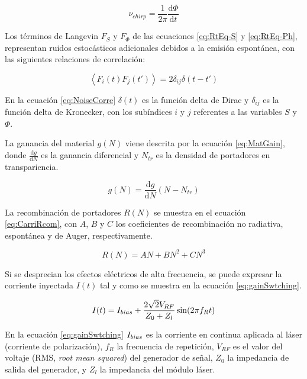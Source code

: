 			\begin{equation}
				\nu_{chirp} = \frac{1}{2\pi} \frac{\mathrm{d} \Phi}{\mathrm{d} t}
			\end{equation}%

Los términos de Langevin $F_S$ y $F_{\Phi}$ de las ecuaciones \ref{eq:RtEq-S} y \ref{eq:RtEq-Ph}, representan ruidos estocásticos adicionales debidos a la emisión espontánea, con las siguientes relaciones de correlación:

	\begin{equation}
		\left \langle F_i(t)F_j(t') \right \rangle = 2\delta_{ij}\delta(t-t')
		\label{eq:NoiseCorre}
	\end{equation}

En la ecuación \ref{eq:NoiseCorre} $\delta(t)$ es la función delta de Dirac y $\delta_{ij}$ es la función delta de Kronecker, con los subíndices $i$ y $j$ referentes a las variables $S$ y $\Phi$.

La ganancia del material $g(N)$ viene descrita por la ecuación \ref{eq:MatGain}, donde $\frac{\mathrm{d}g}{\mathrm{d}N}$ es la ganancia diferencial y $N_{tr}$ es la densidad de portadores en transpariencia.

	\begin{equation}
		g(N) = \frac{\mathrm{d}g}{\mathrm{d}N} (N - N_{tr})
		\label{eq:MatGain}
	\end{equation}

La recombinación de portadores $R(N)$ se muestra en el ecuación \ref{eq:CarriRcom}, con $A$, $B$ y $C$ los coeficientes de recombinación no radiativa, espontánea y de Auger, respectivamente.

	\begin{equation}
		R(N) = AN + BN^2 + CN^3
		\label{eq:CarriRcom}
	\end{equation}

Si se desprecian los efectos el\'ectricos de alta frecuencia, se puede expresar la corriente inyectada $I(t)$ tal y como se muestra en la ecuación \ref{eq:gainSwtching}.

	\begin{equation}
		I(t) = I_{bias} + \frac{2\sqrt{2}V_{RF}}{Z_0+Z_l} \sin(2\pi f_R t)
		\label{eq:gainSwtching}
	\end{equation}

	En la ecuación \ref{eq:gainSwtching} $I_{bias}$ es la corriente en continua aplicada al láser (corriente de polarización), $f_R$ la frecuencia de repetici\'on, $V_{RF}$ es el valor del voltaje (RMS, \textit{root mean squared}) del generador de señal, $Z_0$ la impedancia de salida del generador, y $Z_l$ la impedancia del m\'odulo l\'aser.

